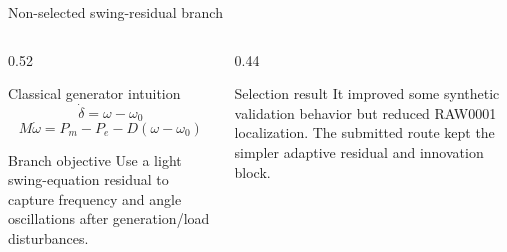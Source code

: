 ﻿\documentclass[10pt,aspectratio=169]{beamer}
\begin{document}
\fi
\iffalse
\begin{frame}{Non-selected swing-residual branch}
\small
\begin{columns}[T,totalwidth=\textwidth]
\begin{column}{0.52\textwidth}
\begin{block}{Classical generator intuition}
\[
\dot{\delta}=\omega-\omega_0
\]
\[
M\dot{\omega}=P_m-P_e-D(\omega-\omega_0)
\]
\end{block}
\begin{exampleblock}{Branch objective}
Use a light swing-equation residual to capture frequency and angle oscillations after generation/load disturbances.
\end{exampleblock}
\end{column}
\begin{column}{0.44\textwidth}
\centering
{}
\vspace{2mm}
\begin{alertblock}{Selection result}
It improved some synthetic validation behavior but reduced RAW0001 localization. The submitted route kept the simpler adaptive residual and innovation block.
\end{alertblock}
\end{column}
\end{columns}
\end{frame}

\end{document}

